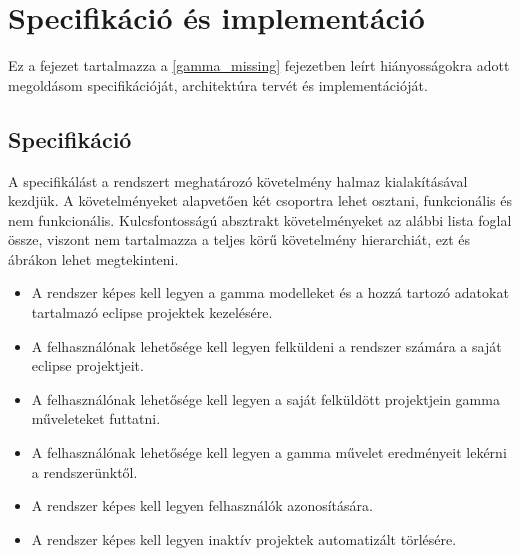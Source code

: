 \chapter{Specifikáció és implementáció}

Ez a fejezet tartalmazza a \ref{gamma_missing} fejezetben leírt hiányosságokra adott megoldásom specifikációját, architektúra tervét és implementációját. 

\section{Specifikáció}

A specifikálást a rendszert meghatározó követelmény halmaz kialakításával kezdjük. A követelményeket alapvetően két csoportra lehet osztani, funkcionális és nem funkcionális. Kulcsfontosságú absztrakt követelményeket az alábbi lista foglal össze, viszont nem tartalmazza a teljes körű követelmény hierarchiát, ezt  és  ábrákon lehet megtekinteni.

\begin{itemize}
	\item A rendszer képes kell legyen a gamma modelleket és a hozzá tartozó adatokat tartalmazó eclipse projektek kezelésére.
	\item A felhasználónak lehetősége kell legyen felküldeni a rendszer számára a saját eclipse projektjeit.
	\item A felhasználónak lehetősége kell legyen a saját felküldött projektjein gamma műveleteket futtatni.
	\item A felhasználónak lehetősége kell legyen a gamma művelet eredményeit lekérni a rendszerünktől.
	\item A rendszer képes kell legyen felhasználók azonosítására.
	\item A rendszer képes kell legyen inaktív projektek automatizált törlésére.
\end{itemize}

